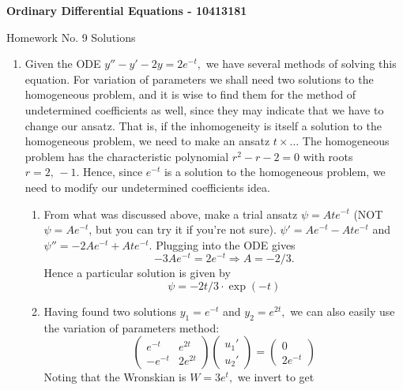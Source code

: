 \documentclass[10pt,a4paper]{letter}
\begin{document}
\begin{center}
\begin{Large}
\textbf{Ordinary Differential Equations - 10413181}\\
\end{Large}
\vspace{1em}
\begin{large}Homework No. 9 Solutions\end{large}
\end{center}

\begin{enumerate}
\item Given the ODE $y'' - y' - 2y = 2e^{-t},$ we have several methods of solving this equation. For variation of parameters we shall need two solutions to the homogeneous problem, and it is wise to find them for the method of undetermined coefficients as well, since they may indicate that we have to change our ansatz. That is, if the inhomogeneity is itself a solution to the homogeneous problem, we need to make an ansatz $t \times \ldots$ 
The homogeneous problem has the characteristic polynomial $r^2 - r - 2 = 0$ with roots $r = 2, \, -1.$ Hence, since $e^{-t}$ is a solution to the homogeneous problem, we need to modify our undetermined coefficients idea. 
\begin{enumerate}
\item From what was discussed above, make a trial ansatz $\psi = At e^{-t}$ (NOT $\psi = Ae^{-t}$, but you can try it if you're not sure). $\psi' = Ae^{-t} - Ate^{-t}$ and $\psi'' = -2Ae^{-t} + Ate^{-t}.$ Plugging into the ODE gives
\[ -3Ae^{-t} = 2 e^{-t} \Rightarrow A = -2/3. \]
Hence a particular solution is given by 
\[ \psi = -2t/3\cdot \exp(-t) \] 
\item Having found two solutions $y_1 = e^{-t}$ and $y_2 = e^{2t},$ we can also easily use the variation of parameters method:
\begin{equation}
\begin{pmatrix}
e^{-t} & e^{2t} \\
-e^{-t} & 2e^{2t}
\end{pmatrix}
\begin{pmatrix}
u_1' \\
u_2'
\end{pmatrix}
= 
\begin{pmatrix}
0 \\
2e^{-t}
\end{pmatrix}
\end{equation}
Noting that the Wronskian is $W = 3e^{t},$ we invert to get

\end{enumerate}
\end{enumerate}
\end{document}
